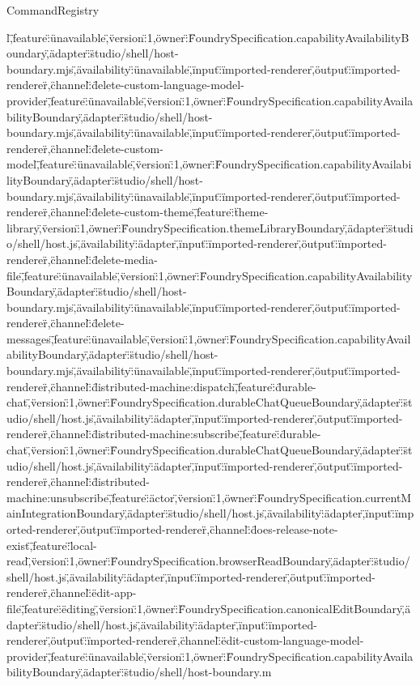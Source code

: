\begin{lexlean}{CommandRegistry}
\begin{semanticmodule}
{l\",\"feature\":\"unavailable\",\"version\":1,\"owner\":\"FoundrySpecification.capabilityAvailabilityBoundary\",\"adapter\":\"studio/shell/host-boundary.mjs\",\"availability\":\"unavailable\",\"input\":\"imported-renderer\",\"output\":\"imported-renderer\"},{\"channel\":\"delete-custom-language-model-provider\",\"feature\":\"unavailable\",\"version\":1,\"owner\":\"FoundrySpecification.capabilityAvailabilityBoundary\",\"adapter\":\"studio/shell/host-boundary.mjs\",\"availability\":\"unavailable\",\"input\":\"imported-renderer\",\"output\":\"imported-renderer\"},{\"channel\":\"delete-custom-model\",\"feature\":\"unavailable\",\"version\":1,\"owner\":\"FoundrySpecification.capabilityAvailabilityBoundary\",\"adapter\":\"studio/shell/host-boundary.mjs\",\"availability\":\"unavailable\",\"input\":\"imported-renderer\",\"output\":\"imported-renderer\"},{\"channel\":\"delete-custom-theme\",\"feature\":\"theme-library\",\"version\":1,\"owner\":\"FoundrySpecification.themeLibraryBoundary\",\"adapter\":\"studio/shell/host.js\",\"availability\":\"adapter\",\"input\":\"imported-renderer\",\"output\":\"imported-renderer\"},{\"channel\":\"delete-media-file\",\"feature\":\"unavailable\",\"version\":1,\"owner\":\"FoundrySpecification.capabilityAvailabilityBoundary\",\"adapter\":\"studio/shell/host-boundary.mjs\",\"availability\":\"unavailable\",\"input\":\"imported-renderer\",\"output\":\"imported-renderer\"},{\"channel\":\"delete-messages\",\"feature\":\"unavailable\",\"version\":1,\"owner\":\"FoundrySpecification.capabilityAvailabilityBoundary\",\"adapter\":\"studio/shell/host-boundary.mjs\",\"availability\":\"unavailable\",\"input\":\"imported-renderer\",\"output\":\"imported-renderer\"},{\"channel\":\"distributed-machine:dispatch\",\"feature\":\"durable-chat\",\"version\":1,\"owner\":\"FoundrySpecification.durableChatQueueBoundary\",\"adapter\":\"studio/shell/host.js\",\"availability\":\"adapter\",\"input\":\"imported-renderer\",\"output\":\"imported-renderer\"},{\"channel\":\"distributed-machine:subscribe\",\"feature\":\"durable-chat\",\"version\":1,\"owner\":\"FoundrySpecification.durableChatQueueBoundary\",\"adapter\":\"studio/shell/host.js\",\"availability\":\"adapter\",\"input\":\"imported-renderer\",\"output\":\"imported-renderer\"},{\"channel\":\"distributed-machine:unsubscribe\",\"feature\":\"actor\",\"version\":1,\"owner\":\"FoundrySpecification.currentMainIntegrationBoundary\",\"adapter\":\"studio/shell/host.js\",\"availability\":\"adapter\",\"input\":\"imported-renderer\",\"output\":\"imported-renderer\"},{\"channel\":\"does-release-note-exist\",\"feature\":\"local-read\",\"version\":1,\"owner\":\"FoundrySpecification.browserReadBoundary\",\"adapter\":\"studio/shell/host.js\",\"availability\":\"adapter\",\"input\":\"imported-renderer\",\"output\":\"imported-renderer\"},{\"channel\":\"edit-app-file\",\"feature\":\"editing\",\"version\":1,\"owner\":\"FoundrySpecification.canonicalEditBoundary\",\"adapter\":\"studio/shell/host.js\",\"availability\":\"adapter\",\"input\":\"imported-renderer\",\"output\":\"imported-renderer\"},{\"channel\":\"edit-custom-language-model-provider\",\"feature\":\"unavailable\",\"version\":1,\"owner\":\"FoundrySpecification.capabilityAvailabilityBoundary\",\"adapter\":\"studio/shell/host-boundary.m}
\end{semanticmodule}
\end{lexlean}
